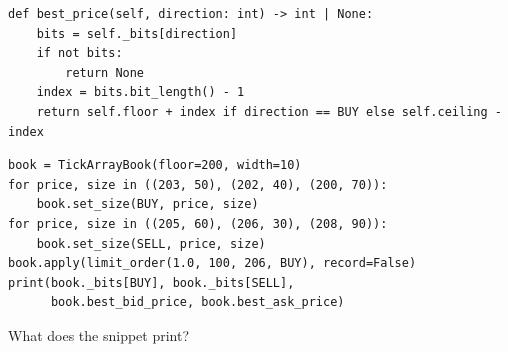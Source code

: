 \begin{question}
\begin{lstlisting}[caption={\protect\codehl{unito26.lob.orderbook.TickArrayBook}: a write, and the best price, abridged.}, label=listing.tickArrayIntegersWrite]
def best_price(self, direction: int) -> int | None:
    bits = self._bits[direction]
    if not bits:
        return None
    index = bits.bit_length() - 1
    return self.floor + index if direction == BUY else self.ceiling - index
\end{lstlisting}
\begin{lstlisting}[caption={The two integers after a crossing buy}, label=listing.tickArrayIntegersRun]
book = TickArrayBook(floor=200, width=10)
for price, size in ((203, 50), (202, 40), (200, 70)):
    book.set_size(BUY, price, size)
for price, size in ((205, 60), (206, 30), (208, 90)):
    book.set_size(SELL, price, size)
book.apply(limit_order(1.0, 100, 206, BUY), record=False)
print(book._bits[BUY], book._bits[SELL],
      book.best_bid_price, book.best_ask_price)
\end{lstlisting}
What does the snippet print?
\begin{choices}
 \choice {}
 \choice {}
 \correctchoice {}
 \choice {}
 \choice {}
\end{choices}
\end{question}

